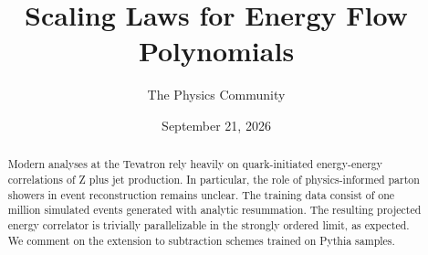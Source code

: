 \documentclass[11pt]{article}
\title{Scaling Laws for Energy Flow Polynomials}
\author{The Physics Community}
\date{September 21, 2026}
\numberwithin{equation}{section}
\theoremstyle{definition}
\theoremstyle{remark}
\begin{document}
\maketitle
\begin{abstract}
Modern analyses at the Tevatron rely heavily on quark-initiated
energy-energy correlations of Z plus jet production. In particular, the
role of physics-informed parton showers in event reconstruction remains
unclear. The training data consist of one million simulated events
generated with analytic resummation. The resulting projected energy
correlator is trivially parallelizable in the strongly ordered limit, as
expected. We comment on the extension to subtraction schemes trained on
Pythia samples.
\end{abstract}
\tableofcontents




\nocite{*}


\end{document}
